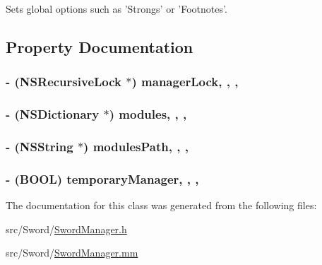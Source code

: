 Sets global options such as 'Strongs' or 'Footnotes'. 

\subsection{Property Documentation}
\hypertarget{interface_sword_manager_a30dcad661c1ead69f05828725d6a205d}{
\subsubsection[{manager\-Lock}]{\setlength{\rightskip}{0pt plus 5cm}-\/ (N\-S\-Recursive\-Lock $\ast$) manager\-Lock\hspace{0.3cm}{\ttfamily [read]}, {\ttfamily [write]}, {\ttfamily [atomic]}, {\ttfamily [retain]}}}\label{interface_sword_manager_a30dcad661c1ead69f05828725d6a205d}
\hypertarget{interface_sword_manager_a281f6d11d15ea61d2d0aa49a9ed046b4}{
\subsubsection[{modules}]{\setlength{\rightskip}{0pt plus 5cm}-\/ (N\-S\-Dictionary $\ast$) modules\hspace{0.3cm}{\ttfamily [read]}, {\ttfamily [write]}, {\ttfamily [atomic]}, {\ttfamily [retain]}}}\label{interface_sword_manager_a281f6d11d15ea61d2d0aa49a9ed046b4}
\hypertarget{interface_sword_manager_aa7d416dd4dc46d4975463066f7cf15b8}{
\subsubsection[{modules\-Path}]{\setlength{\rightskip}{0pt plus 5cm}-\/ (N\-S\-String $\ast$) modules\-Path\hspace{0.3cm}{\ttfamily [read]}, {\ttfamily [write]}, {\ttfamily [atomic]}, {\ttfamily [retain]}}}\label{interface_sword_manager_aa7d416dd4dc46d4975463066f7cf15b8}
\hypertarget{interface_sword_manager_a4242622569ad00cbb80aa23107c38791}{
\subsubsection[{temporary\-Manager}]{\setlength{\rightskip}{0pt plus 5cm}-\/ (B\-O\-O\-L) temporary\-Manager\hspace{0.3cm}{\ttfamily [read]}, {\ttfamily [write]}, {\ttfamily [atomic]}, {\ttfamily [assign]}}}\label{interface_sword_manager_a4242622569ad00cbb80aa23107c38791}


The documentation for this class was generated from the following files\-:\begin{DoxyCompactItemize}
\item 
src/\-Sword/\hyperlink{_sword_manager_8h}{Sword\-Manager.\-h}\item 
src/\-Sword/\hyperlink{_sword_manager_8mm}{Sword\-Manager.\-mm}\end{DoxyCompactItemize}
